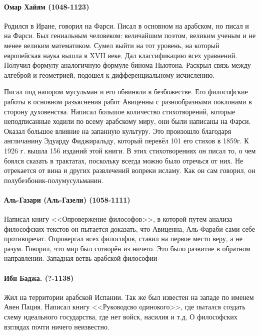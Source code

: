 \paragraph{Омар Хайям (1048-1123)}

Родился в Иране, говорил на Фарси. Писал в основном на арабском, но писал и на Фарси. Был гениальным человеком: величайшим поэтом, великим ученым и не менее великим математиком. Сумел выйти на тот уровень, на который европейская наука вышла в XVII веке. Дал классификацию всех уравнений. Получил формулу аналогичную формуле бинома Ньютона. Раскрыл связь между алгеброй и геометрией, подошел к дифференциальному исчислению.

Писал под напором мусульман и его обвиняли в безбожестве. Его философские работы в основном разъяснения работ Авиценны с разнообразными поклонами в сторону духовенства. Написал большое количество стихотворений, которые неподписанные ходили по всему арабскому миру, они были написаны на Фарси. Оказал большое влияние на запанную культуру. Это произошло благодаря англичанину Эдуарду Фиджиральду, который перевёл 101 его стихов в 1859г. К 1926 г. вышла 156 изданий этой книги. В этих стихотворениях он писал то, о чем боялся сказать в трактатах, поскольку всегда можно было отречься от них. Не отрекается от вина и других развлечений вопреки исламу. Как он сам говорил, он полубезбоник-полумусульманин.

\paragraph{Аль-Газари (Аль-Газели) (1058-1111)}

Написал книгу <<Опровержение философов>>, в которой путем анализа философских текстов он пытается доказать, что Авиценна, Аль-Фараби сами себе противоречат. Опровергал всех философов, ставил на первое место веру, а не разум. Говорил, что мир был сотворён из ничего. Это было развитие в обратном направлении.
Западная ветвь арабской философии

\paragraph{Ибн Баджа. (?-1138)}

Жил на территории арабской Испании. Так же был известен на западе по именем Авен Пация. Написал книгу <<Руководсво одинокого>>, где пытался создать схему идеального государства, где нет войск, насилия и т.д. О философских взглядах почти ничего неизвестно.

